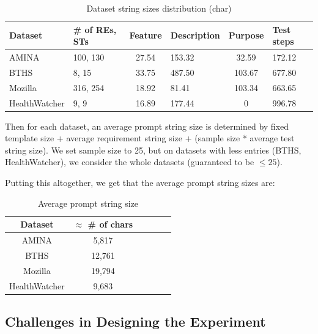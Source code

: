 \documentclass[conference]{IEEEtran}
\begin{document}
\begin{table}[h]
    \centering
    \caption{Dataset string sizes distribution (char)}
    \begin{tabular}{||p{1.65cm}|p{1.1cm}|c|p{1.1cm}|c|p{0.75cm}||}
    \hline
    Dataset & \# of REs, STs & Feature & Description & Purpose & Test steps \\
    \hline
    AMINA         & 100, 130 & 27.54 & 153.32 & 32.59  & 172.12 \\
    BTHS          & 8, 15    & 33.75 & 487.50 & 103.67 & 677.80 \\
    Mozilla       & 316, 254 & 18.92 & 81.41  & 103.34 & 663.65 \\
    HealthWatcher & 9, 9     & 16.89 & 177.44 & 0      & 996.78 \\
    \hline
    \end{tabular}
\end{table}

Then for each dataset, an average prompt string size is determined by fixed template size + average requirement string size + (sample size * average test string size). We set sample size to 25, but on datasets with less entries (BTHS, HealthWatcher), we consider the whole datasets (guaranteed to be $\leq 25$).

Putting this altogether, we get that the average prompt string sizes are:

\begin{table}[h]
    \centering
    \caption{Average prompt string size}
    \begin{tabular}{||c|c|c|c|c|c||}
    \hline
    Dataset & $\approx$ \# of chars \\
    \hline
    AMINA         & 5,817 \\
    BTHS          & 12,761 \\
    Mozilla       & 19,794 \\
    HealthWatcher & 9,683 \\
    \hline
    \end{tabular}
\end{table}


\subsection{Challenges in Designing the Experiment}
\end{document}
